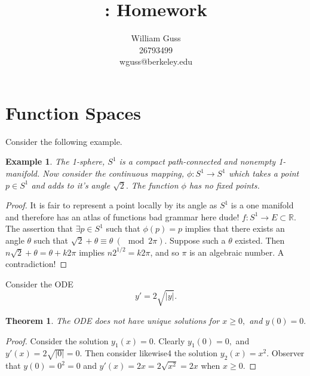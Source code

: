 \documentclass[letter]{article}
\title{\bCLASS: Homework \bHWN}
\author{William Guss\\26793499\\wguss@berkeley.edu}
\newtheorem{theorem}{Theorem}
\newtheorem{example}{Example}
\newenvironment{menumerate}{%
  \edef\backupindent{\the\parindent}%
  \enumerate%
  \setlength{\parindent}{\backupindent}%
}{\endenumerate}
\begin{document}
\maketitle
\thispagestyle{empty}


\setcounter{section}{3}
\section{Function Spaces}
\begin{menumerate}
\setcounter{enumi}{29}
    \item Consider the following example.
    \begin{example}
        The 1-sphere, $S^1$ is a compact path-connected and nonempty 1-manifold. Now consider the continuous mapping,
         $\phi: S^1 \to S^1$ which takes a point $p \in S^1$ and adds to it's angle $\sqrt{2}.$ The function $\phi$ 
         has no fixed points.
    \end{example}
    \begin{proof}
        It is fair to represent a point locally by its angle as $S^1$ is a one manifold and therefore has an atlas of functions {bad grammar here dude!}
        $f: S^1 \to E \subset \mathbb{R}$. The assertion that $\exists p \in S^1$ such that $\phi(p) = p$ implies that there exists
        an angle $\theta$ such that $\sqrt{2} + \theta \equiv \theta  \  (\mod 2\pi).$ Suppose such a $\theta$ existed.
         Then $n\sqrt{2} + \theta = \theta + k2\pi$ implies $n2^{1/2} = k2\pi$, and so $\pi$ is an algebraic number. A contradiction!
    \end{proof}

\setcounter{enumi}{33}
\item Consider the ODE $$y' = 2\sqrt{|y|}.$$  
    \begin{theorem}
        The ODE does not have unique solutions for $x \geq 0,$ and $y(0) = 0.$
    \end{theorem}
    \begin{proof}
        Consider the solution $y_1(x) = 0.$ Clearly $y_1(0) = 0,$ and $y'(x) = 2\sqrt{|0|} = 0.$ 
        Then consider likewise4 the solution $y_2(x) = x^2.$ Observer that $y(0) = 0^2 = 0$ and
        $y'(x) = 2x = 2\sqrt{x^2} = 2x$ when $x \geq 0.$
    \end{proof}


\end{menumerate}
\end{document}
